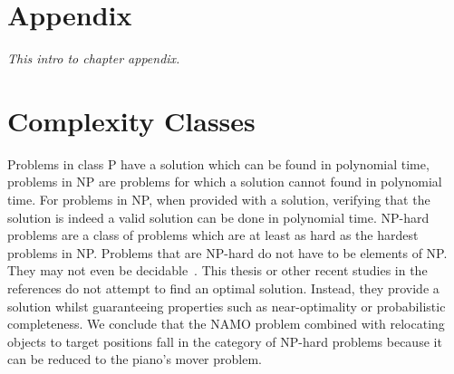 \chapter{Appendix}%
\label{chap:appendix}

\appendix

\textit{This intro to chapter appendix.\bs}

%

\chapter{Complexity Classes}%
\label{chap:appendix_complexity_classes}
Problems in class P have a solution which can be found in polynomial time, problems in \ac{NP} are problems for which a solution cannot found in polynomial time. For problems in \ac{NP}, when provided with a solution, verifying that the solution is indeed a valid solution can be done in polynomial time. \ac{NP-hard} problems are a class of problems which are at least as hard as the hardest problems in \ac{NP}. Problems that are \ac{NP-hard} do not have to be elements of NP. They may not even be decidable~\cite{pokharel_computational_2020}. This thesis or other recent studies in the references do not attempt to find an optimal solution. Instead, they provide a solution whilst guaranteeing properties such as near-optimality or probabilistic completeness. We conclude that the \ac{NAMO} problem combined with relocating objects to target positions fall in the category of \ac{NP-hard} problems because it can be reduced to the piano's mover problem.\bs

